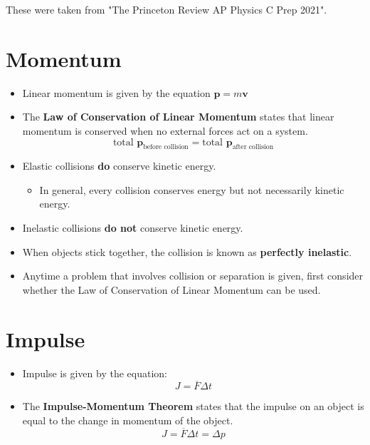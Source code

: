 \documentclass{article}
\begin{document}
\begin{note}
    These were taken from "The Princeton Review AP Physics C Prep 2021". 
\end{note}

\section{Momentum}
\begin{itemize}
    \item Linear momentum is given by the equation $\textbf{p} = m\textbf{v}$
    \item The \textbf{Law of Conservation of Linear Momentum} states that linear momentum is conserved when no external forces act on a system.
    \begin{equation*}
        \text{total   } \textbf{p}_{\text{before collision}} = \text{total   } \textbf{p}_{\text{after collision}}
    \end{equation*}
    \item Elastic collisions \textbf{do} conserve kinetic energy.
        \begin{itemize}
            \item In general, every collision conserves energy but not necessarily kinetic energy.
        \end{itemize}
    \item Inelastic collisions \textbf{do not} conserve kinetic energy.
    \item When objects stick together, the collision is known as \textbf{perfectly inelastic}.
    \item Anytime a problem that involves collision or separation is given, first consider whether the Law of Conservation of Linear Momentum can be used.
\end{itemize}

\section{Impulse}
\begin{itemize}
    \item Impulse is given by the equation:
    \begin{equation*}
        J=\overline{F}\Delta t
    \end{equation*}
    \item The \textbf{Impulse-Momentum Theorem} states that the impulse on an object is equal to the change in momentum of the object.
    \begin{equation*}
        J=\overline{F}\Delta t = \Delta p
    \end{equation*}
\end{itemize}
\end{document}
